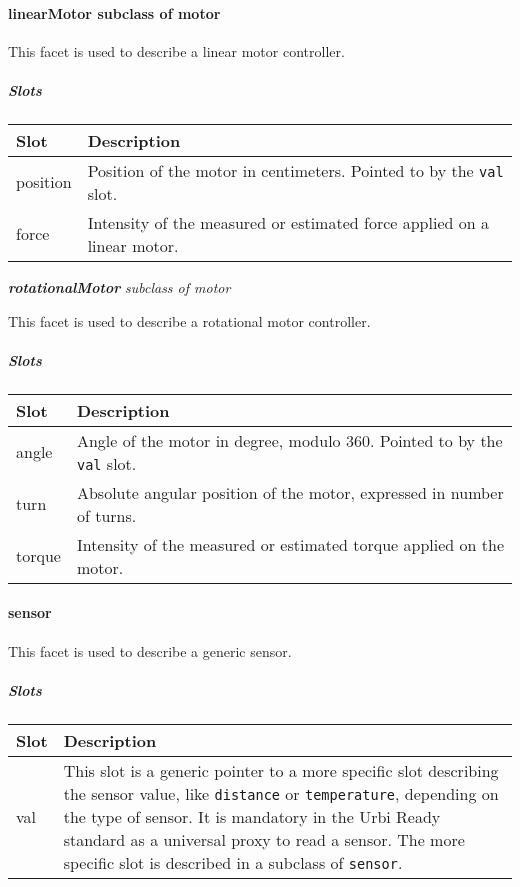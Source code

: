 \documentclass[a4paper]{article}
\begin{document}
\paragraph{ linearMotor  \textmd{subclass of motor}}


This facet is used to describe a linear motor controller.

\subparagraph{Slots}

\begin{flushleft}
\tablehead{}
\begin{supertabular}{|m{2.8669999cm}|m{12.422cm}|}
\hline
\sffamily\bfseries Slot &
\sffamily\bfseries Description\\\hline
position &
\sffamily Position of the motor in centimeters.
Pointed to by the \texttt{val} slot.\\\hline
force &
\sffamily Intensity of the measured or estimated
force applied on a linear motor.\\\hline
\end{supertabular}
\end{flushleft}
{
     \textsf{\textbf{\textit{rotationalMotor}}}
\textsf{\textit{subclass of motor}}}


This facet is used to describe a rotational motor controller.

\subparagraph{Slots}

\begin{flushleft}
\tablehead{}
\begin{supertabular}{|m{2.8669999cm}|m{12.422cm}|}
\hline
\sffamily\bfseries Slot &
\sffamily\bfseries Description\\\hline
angle &
\sffamily Angle of the motor in degree, modulo
360. Pointed to by the \texttt{val} slot.\\\hline
turn &
\sffamily Absolute angular position of the
motor, expressed in number of turns.\\\hline
torque &
\sffamily Intensity of the measured or estimated
torque applied on the motor.\\\hline
\end{supertabular}
\end{flushleft}
\paragraph{sensor}


This facet is used to describe a generic sensor.

\subparagraph{Slots}

\begin{flushleft}
\tablehead{}
\begin{supertabular}{|m{2.8669999cm}|m{12.422cm}|}
\hline
\sffamily\bfseries Slot &
\sffamily\bfseries Description\\\hline
val &
\sffamily This slot is a generic pointer to a
more specific slot describing the sensor value, like \texttt{distance}
or \texttt{temperature}, depending on the type of sensor. It is
mandatory in the Urbi Ready standard as a universal proxy to read a
sensor. The more specific slot is described in a subclass of
\texttt{sensor}.\\\hline
\end{supertabular}
\end{flushleft}
\end{document}
